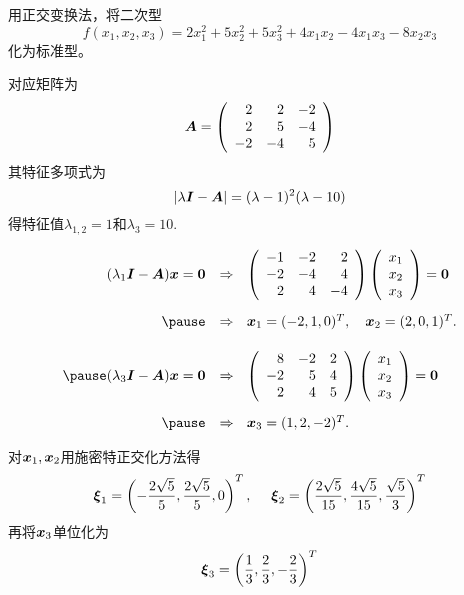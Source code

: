 \begin{frame}
  
    \begin{li}
      用正交变换法，将二次型
      $$
      f(x_1,x_2,x_3)=2x_1^2+5x_2^2+5x_3^2+4x_1x_2-4x_1x_3-8x_2x_3
      $$
      化为标准型。
    \end{li} \pause
    
    \begin{jie}
    对应矩阵为
    $$
    \boldsymbol{A}=\left(
    \begin{array}{rrr}
      2&2&-2\\
      2&5&-4\\
      -2&-4&5
    \end{array}
    \right)
    $$
    \pause
    其特征多项式为
    $$
    |\lambda\boldsymbol{I}-\boldsymbol{A}|=(\lambda-1)^2(\lambda-10)
    $$
    得特征值$\lambda_{1,2}=1$和$\lambda_3=10$.
    \end{jie}
  
\end{frame}


\begin{frame}
  
    $$
    \begin{array}{rl}
      (\lambda_1\II-\A)\xx=\zero & \Rightarrow~~
      \left(
      \begin{array}{rrr}
        -1&-2&2\\
        -2&-4&4\\
        2&4&-4
      \end{array}
      \right)\left(
      \begin{array}{c}
        x_1\\
        x_2\\
        x_3
      \end{array}
      \right)=\zero\\[0.3in] \pause
      & \Rightarrow~~
      \xx_1=(-2,1,0)^T, \quad
      \xx_2=(2,0,1)^T. \\[0.2in]\pause
      (\lambda_3\II-\A)\xx=\zero & \Rightarrow~~
      \left(
      \begin{array}{rrr}
        8&-2&2\\
        -2&5&4\\
        2&4&5
      \end{array}
      \right)\left(
      \begin{array}{c}
        x_1\\
        x_2\\
        x_3
      \end{array}
      \right)=\zero\\[0.3in] \pause
      & \Rightarrow~~
      \xx_3=(1,2,-2)^T.
    \end{array}
    $$ \pause 

    对${\boldsymbol{x}}_1,{\boldsymbol{x}}_2$用施密特正交化方法得
    $$
    \boldsymbol{\xi}_1=\left(-\frac{2\sqrt{5}}5,\frac{2\sqrt{5}}5,0\right)^T,~~~~
    \boldsymbol{\xi}_2=\left(\frac{2\sqrt{5}}{15},\frac{4\sqrt{5}}{15},\frac{\sqrt{5}}3\right)^T
    $$
    再将${\boldsymbol{x}}_3$单位化为
    $$
    \boldsymbol{\xi}_3=\left(\frac13,\frac23,-\frac23\right)^T
    $$
  
\end{frame}


